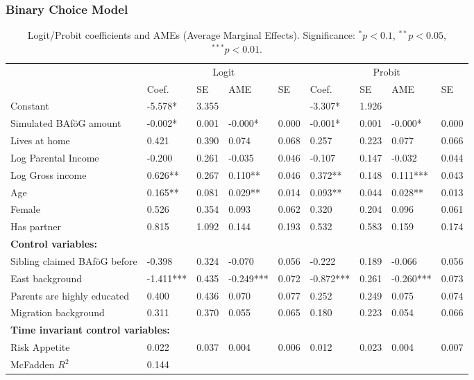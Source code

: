 \subsubsection{Binary Choice Model}

\begin{table}
\renewcommand{\arraystretch}{1.25}
\footnotesize
\label{tab:logit-probit-ame}
\begin{tabular}{lllllllll}
\toprule
 & \multicolumn{4}{c}{Logit} & \multicolumn{4}{c}{Probit} \\ 
\cmidrule(lr){2-5} \cmidrule(lr){6-9}
 & Coef. & SE & AME & SE & Coef. & SE & AME & SE \\
 \midrule
Constant                      & -5.578*     & 3.355    &            &       & -3.307*   & 1.926    &            &  \\
Simulated BAföG amount        & -0.002*     & 0.001    & -0.000*    & 0.000 & -0.001*   & 0.001    & -0.000*    & 0.000 \\
Lives at home                 & 0.421       & 0.390    & 0.074      & 0.068 & 0.257     & 0.223    & 0.077      & 0.066 \\
Log Parental Income           & -0.200      & 0.261    & -0.035     & 0.046 & -0.107    & 0.147    & -0.032     & 0.044 \\
Log Gross income              & 0.626**     & 0.267    & 0.110**    & 0.046 & 0.372**   & 0.148    & 0.111***   & 0.043 \\
Age                           & 0.165**     & 0.081    & 0.029**    & 0.014 & 0.093**   & 0.044    & 0.028**    & 0.013 \\
Female                        & 0.526       & 0.354    & 0.093      & 0.062 & 0.320     & 0.204    & 0.096      & 0.061 \\
Has partner                   & 0.815       & 1.092    & 0.144      & 0.193 & 0.532     & 0.583    & 0.159      & 0.174 \\
\midrule
\multicolumn{9}{l}{\textbf{Control variables:}} \\
Sibling claimed BAföG before  & -0.398      & 0.324    & -0.070     & 0.056 & -0.222    & 0.189    & -0.066     & 0.056 \\
East background               & -1.411***   & 0.435    & -0.249***  & 0.072 & -0.872*** & 0.261    & -0.260***  & 0.073 \\
Parents are highly educated   & 0.400       & 0.436    & 0.070      & 0.077 & 0.252     & 0.249    & 0.075      & 0.074 \\
Migration background          & 0.311       & 0.370    & 0.055      & 0.065 & 0.180     & 0.223    & 0.054      & 0.066 \\
\midrule
\multicolumn{9}{l}{\textbf{Time invariant control variables:}} \\
Risk Appetite                 & 0.022       & 0.037    & 0.004 & 0.006 & 0.012 & 0.023  & 0.004     & 0.007 \\
\midrule 
McFadden \( R^2 \) & 0.144 \\
\bottomrule
\end{tabular}
\caption{Logit/Probit coefficients and AMEs (Average Marginal Effects). Significance: $^{*} p < 0.1$, $^{**} p < 0.05$, $^{***} p < 0.01$.}
\end{table}



